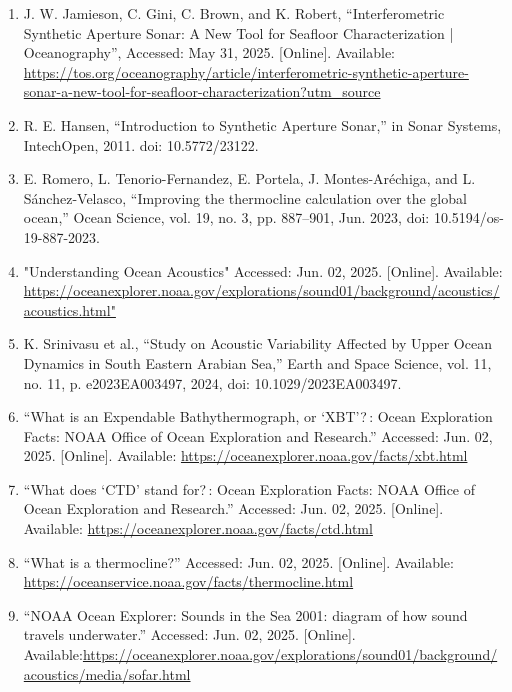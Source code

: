 \documentclass{article}
\begin{document}
\begin{sloppypar}
\begin{enumerate}
    \item{J. W. Jamieson, C. Gini, C. Brown, and K. Robert, “Interferometric Synthetic Aperture Sonar: A New Tool for Seafloor Characterization | Oceanography”, Accessed: May 31, 2025. [Online]. Available: \url{https://tos.org/oceanography/article/interferometric-synthetic-aperture-sonar-a-new-tool-for-seafloor-characterization?utm_source}}


    \item{R. E. Hansen, “Introduction to Synthetic Aperture Sonar,” in Sonar Systems, IntechOpen, 2011. doi: 10.5772/23122.}

    \item{E. Romero, L. Tenorio-Fernandez, E. Portela, J. Montes-Aréchiga, and L. Sánchez-Velasco, “Improving the thermocline calculation over the global ocean,” Ocean Science, vol. 19, no. 3, pp. 887–901, Jun. 2023, doi: 10.5194/os-19-887-2023.}

    \item{"Understanding Ocean Acoustics" Accessed: Jun. 02, 2025. [Online]. Available: \url{https://oceanexplorer.noaa.gov/explorations/sound01/background/acoustics/acoustics.html"}}

    \item{K. Srinivasu et al., “Study on Acoustic Variability Affected by Upper Ocean Dynamics in South Eastern Arabian Sea,” Earth and Space Science, vol. 11, no. 11, p. e2023EA003497, 2024, doi: 10.1029/2023EA003497.}

    \item{“What is an Expendable Bathythermograph, or ‘XBT’? : Ocean Exploration Facts: NOAA Office of Ocean Exploration and Research.” Accessed: Jun. 02, 2025. [Online]. Available: \url{https://oceanexplorer.noaa.gov/facts/xbt.html}}


    \item{“What does ‘CTD’ stand for? : Ocean Exploration Facts: NOAA Office of Ocean Exploration and Research.” Accessed: Jun. 02, 2025. [Online]. Available: \url{https://oceanexplorer.noaa.gov/facts/ctd.html}}


    \item{“What is a thermocline?” Accessed: Jun. 02, 2025. [Online]. Available: \url{https://oceanservice.noaa.gov/facts/thermocline.html}}


    \item{“NOAA Ocean Explorer: Sounds in the Sea 2001: diagram of how sound travels underwater.” Accessed: Jun. 02, 2025. [Online]. Available:\url{https://oceanexplorer.noaa.gov/explorations/sound01/background/acoustics/media/sofar.html}}



\end{enumerate}
\end{sloppypar}
\end{document}
